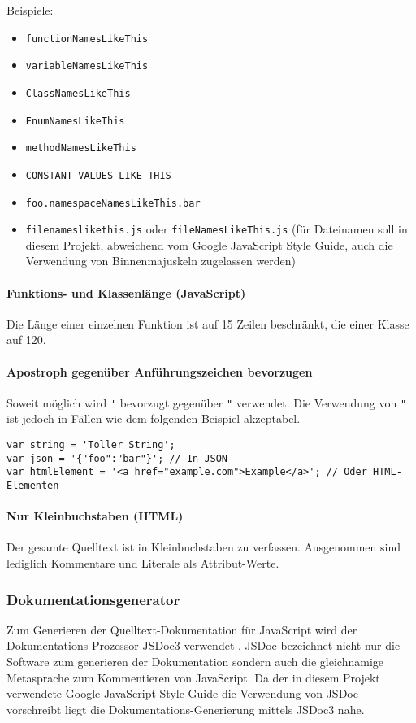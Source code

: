 Beispiele:
\begin{itemize}
\item \verb+functionNamesLikeThis+
\item \verb+variableNamesLikeThis+
\item \verb+ClassNamesLikeThis+
\item \verb+EnumNamesLikeThis+
\item \verb+methodNamesLikeThis+
\item \verb+CONSTANT_VALUES_LIKE_THIS+
\item \verb+foo.namespaceNamesLikeThis.bar+
\item \verb+filenameslikethis.js+ oder \verb+fileNamesLikeThis.js+ (für Dateinamen soll in diesem
  Projekt, abweichend vom Google JavaScript Style Guide, auch die
  Verwendung von Binnenmajuskeln zugelassen werden)
\end{itemize}

\paragraph{Funktions- und Klassenlänge (JavaScript)}

Die Länge einer einzelnen Funktion ist auf 15 Zeilen beschränkt, die
einer Klasse auf 120.

\paragraph{Apostroph gegenüber Anführungszeichen bevorzugen}

Soweit möglich wird \verb+'+ bevorzugt gegenüber \verb+"+ verwendet.
Die Verwendung von \verb+"+ ist jedoch in Fällen wie dem folgenden Beispiel
akzeptabel.
\begin{verbatim}
var string = 'Toller String';
var json = '{"foo":"bar"}'; // In JSON
var htmlElement = '<a href="example.com">Example</a>'; // Oder HTML-Elementen
\end{verbatim}

\paragraph{Nur Kleinbuchstaben (HTML)}

Der gesamte Quelltext ist in Kleinbuchstaben zu verfassen.
Ausgenommen sind lediglich Kommentare und Literale als Attribut-Werte.

\subsubsection{Dokumentationsgenerator}
Zum Generieren der Quelltext-Dokumentation für JavaScript wird der
Dokumentations-Prozessor JSDoc3 verwendet \cite{jsdoc}.
JSDoc bezeichnet nicht nur die Software zum generieren der
Dokumentation sondern auch die gleichnamige Metasprache zum
Kommentieren von JavaScript.
Da der in diesem Projekt verwendete Google JavaScript Style Guide die
Verwendung von JSDoc vorschreibt liegt die Dokumentations-Generierung
mittels JSDoc3 nahe.

